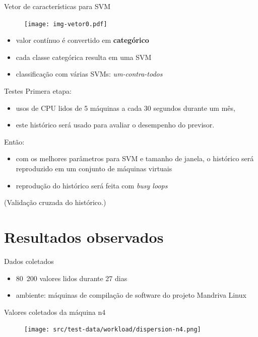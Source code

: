 \documentclass{beamer}
\begin{document}
\begin{frame}{Vetor de características para SVM}
\begin{figure}
\centering
\texttt{[image: img-vetor0.pdf]}
\end{figure}
\begin{itemize}
\item valor contínuo é convertido em \textbf{categórico}
\item cada classe categórica resulta em uma SVM
\item classificação com várias SVMs: \emph{um-contra-todos}
\end{itemize}
\end{frame}

\begin{frame}{Testes}
Primera etapa:
\begin{itemize}
\item usos de CPU lidos de 5 máquinas a cada 30 segundos durante um mês,
\item este histórico será usado para avaliar o desempenho do previsor.
\end{itemize}
Então:
\begin{itemize}
\item com os melhores parâmetros para SVM e tamanho de janela, o histórico
será reproduzido em um conjunto de máquinas virtuais
\item reprodução do histórico será feita com \emph{busy loops}
\end{itemize}
\tiny{(Validação cruzada do histórico.)}
\end{frame}

\section{Resultados observados}

\begin{frame}{Dados coletados}
\begin{itemize}
  \item 80~200 valores lidos durante 27 dias
  \item ambiente: máquinas de compilação de software do projeto Mandriva Linux
\end{itemize}
\end{frame}

\begin{frame}{Valores coletados da máquina n4}
\begin{figure}
\centering
\texttt{[image: src/test-data/workload/dispersion-n4.png]}
\end{figure}
\end{frame}
\end{document}

